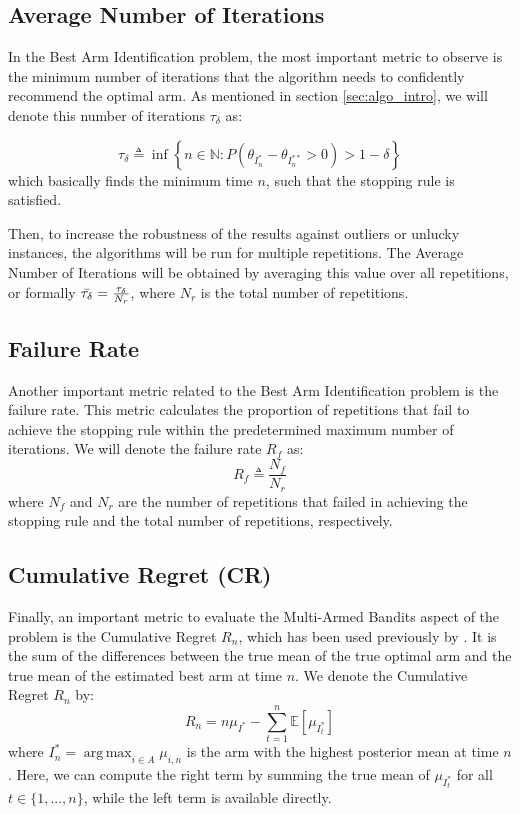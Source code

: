\documentclass[a4paper, 12pt]{article}
\DeclareMathOperator{\argmax}{arg\,max}
\theoremstyle{definition}
\begin{document}
\subsection{Average Number of Iterations}
In the Best Arm Identification problem, the most important metric to observe is the minimum number of iterations that the algorithm needs to confidently recommend the optimal arm. As mentioned in section \ref{sec:algo_intro}, we will denote this number of iterations $\tau_\delta$ as:

\[
\tau_\delta\triangleq \inf\left\{n\in\mathbb{N}:P\left(\theta_{I_n^*}-\theta_{I_n^{**}} > 0\right) > 1-\delta\right\}
\]
which basically finds the minimum time $n$, such that the stopping rule is satisfied. 

Then, to increase the robustness of the results against outliers or unlucky instances, the algorithms will be run for multiple repetitions. The Average Number of Iterations will be obtained by averaging this value over all repetitions, or formally $\Bar{\tau_\delta} = \frac{\tau_\delta}{N_r}$, where $N_r$ is the total number of repetitions.

\subsection{Failure Rate}
Another important metric related to the Best Arm Identification problem is the failure rate. This metric calculates the proportion of repetitions that fail to achieve the stopping rule within the predetermined maximum number of iterations. We will denote the failure rate $R_f$ as:
\[
R_f \triangleq \frac{N_f}{N_r}
\]
where $N_f$ and $N_r$ are the number of repetitions that failed in achieving the stopping rule and the total number of repetitions, respectively.

\subsection{Cumulative Regret (CR)}
Finally, an important metric to evaluate the Multi-Armed Bandits aspect of the problem is the Cumulative Regret $R_n$, which has been used previously by \cite{ucb}. It is the sum of the differences between the true mean of the true optimal arm and the true mean of the estimated best arm at time $n$. We denote the Cumulative Regret $R_n$ by:
\[
R_n = n\mu_{I^*} - \sum_{t=1}^{n} \mathbb{E}\left[\mu_{I_t^*}\right] 
\]
where $I_n^* = \argmax_{i\in A}\mu_{i,n}$ is the arm with the highest posterior mean at time $n$. Here, we can compute the right term by summing the true mean of $\mu_{I_t^*}$ for all $t \in \{1, ..., n\}$, while the left term is available directly.
\end{document}
